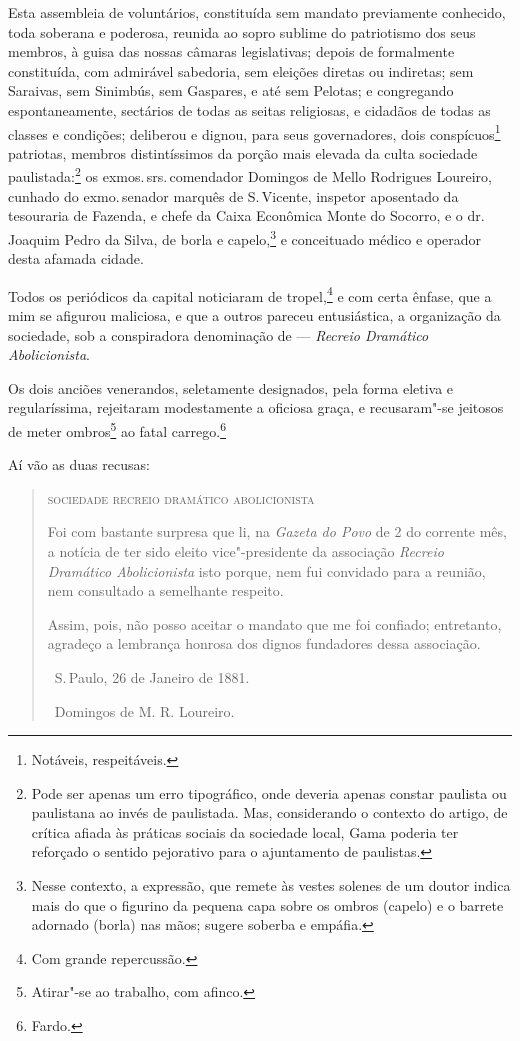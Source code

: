 Esta assembleia de voluntários, constituída sem mandato previamente
conhecido, toda soberana e poderosa, reunida ao sopro sublime do
patriotismo dos seus membros, à guisa das nossas câmaras legislativas;
depois de formalmente constituída, com admirável sabedoria, sem eleições
diretas ou indiretas; sem Saraivas, sem Sinimbús, sem Gaspares, e até
sem Pelotas; e congregando espontaneamente, sectários de todas as seitas
religiosas, e cidadãos de todas as classes e condições; deliberou e
dignou, para seus governadores, dois conspícuos\footnote{Notáveis,
  respeitáveis.} patriotas, membros distintíssimos da porção mais
elevada da culta sociedade paulistada:\footnote{Pode ser apenas um erro
  tipográfico, onde deveria apenas constar paulista ou paulistana ao
  invés de paulistada. Mas, considerando o contexto do artigo, de
  crítica afiada às práticas sociais da sociedade local, Gama poderia
  ter reforçado o sentido pejorativo para o ajuntamento de paulistas.}
os exmos.\,srs.\,comendador Domingos de Mello Rodrigues Loureiro, cunhado
do exmo.\,senador marquês de S.\,Vicente, inspetor aposentado da
tesouraria de Fazenda, e chefe da Caixa Econômica Monte do Socorro, e o
dr.\,Joaquim Pedro da Silva, de borla e capelo,\footnote{Nesse contexto, a expressão, que
  remete às vestes solenes de um doutor indica mais do
  que o figurino da pequena capa sobre os ombros (capelo) e o barrete
  adornado (borla) nas mãos; sugere soberba e empáfia.} e conceituado
médico e operador desta afamada cidade.

Todos os periódicos da capital noticiaram de tropel,\footnote{Com
  grande repercussão.} e com certa ênfase, que a mim se afigurou
maliciosa, e que a outros pareceu entusiástica, a organização da
sociedade, sob a conspiradora denominação de --- \emph{Recreio
Dramático Abolicionista}.

Os dois anciões venerandos, seletamente designados, pela forma eletiva e
regularíssima, rejeitaram modestamente a oficiosa graça, e recusaram"-se
jeitosos de meter ombros\footnote{Atirar"-se ao trabalho, com afinco.}
ao fatal carrego.\footnote{Fardo.}

Aí vão as duas recusas:

\begin{quote}
\textsc{sociedade recreio dramático abolicionista}

Foi com bastante surpresa que li, na \emph{Gazeta do Povo} de 2 do
corrente mês, a notícia de ter sido eleito vice"-presidente da associação
\emph{Recreio Dramático Abolicionista} isto porque, nem fui convidado
para a reunião, nem consultado a semelhante respeito.

Assim, pois, não posso aceitar o mandato que me foi confiado;
entretanto, agradeço a lembrança honrosa dos dignos fundadores dessa
associação.

\hfill\ S.\,Paulo, 26 de Janeiro de 1881.

\hfill\ Domingos de M. R. Loureiro.
\end{quote}

